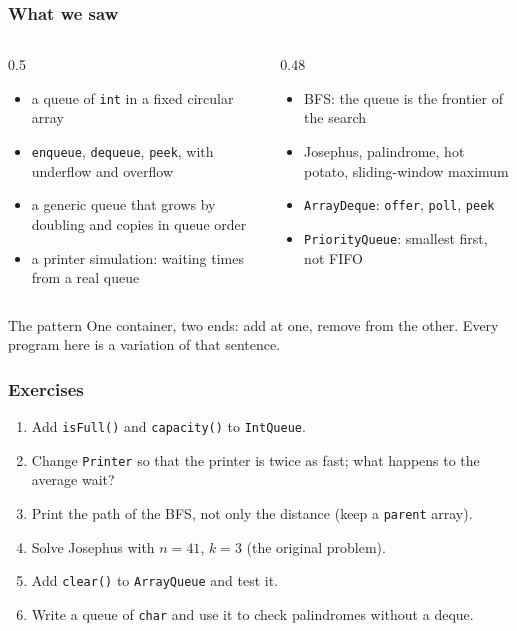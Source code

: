 \documentclass[aspectratio=169,10pt,compress]{beamer}
\begin{document}
\begin{frame}[t,fragile] \frametitle{What we saw}
  \begin{columns}[T]
    \begin{column}{0.5\textwidth}
      \begin{itemize}\small
        \item a queue of \texttt{int} in a fixed circular array
        \item \texttt{enqueue}, \texttt{dequeue}, \texttt{peek}, with underflow and overflow
        \item a generic queue that grows by doubling and copies in queue order
        \item a printer simulation: waiting times from a real queue
      \end{itemize}
    \end{column}
    \begin{column}{0.48\textwidth}
      \begin{itemize}\small
        \item BFS: the queue is the frontier of the search
        \item Josephus, palindrome, hot potato, sliding-window maximum
        \item \texttt{ArrayDeque}: \texttt{offer}, \texttt{poll}, \texttt{peek}
        \item \texttt{PriorityQueue}: smallest first, not FIFO
      \end{itemize}
    \end{column}
  \end{columns}
  \vspace{0.5em}
  \begin{block}{The pattern}
    \small One container, two ends: add at one, remove from the other. Every program here is a variation of that sentence.
  \end{block}
\end{frame}




\begin{frame}[t,fragile] \frametitle{Exercises}
  \begin{enumerate}\small
    \item Add \texttt{isFull()} and \texttt{capacity()} to \texttt{IntQueue}.
    \item Change \texttt{Printer} so that the printer is twice as fast; what happens to the average wait?
    \item Print the path of the BFS, not only the distance (keep a \texttt{parent} array).
    \item Solve Josephus with $n = 41$, $k = 3$ (the original problem).
    \item Add \texttt{clear()} to \texttt{ArrayQueue} and test it.
    \item Write a queue of \texttt{char} and use it to check palindromes without a deque.
  \end{enumerate}
\end{frame}
\end{document}
